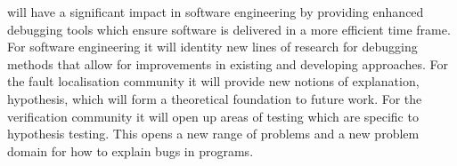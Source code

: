 \project{} will have a significant impact in software engineering by providing enhanced debugging tools which ensure software is delivered in a more efficient time frame. For software engineering it will identity new lines of research for debugging methods that allow
for improvements in existing and developing approaches. For the fault localisation community it will provide new
notions of explanation, hypothesis, which will form a theoretical foundation to future work. For the verification community it will open up areas of testing which are specific to hypothesis testing. This opens a new range of problems and a new problem domain for how to explain bugs in programs.
